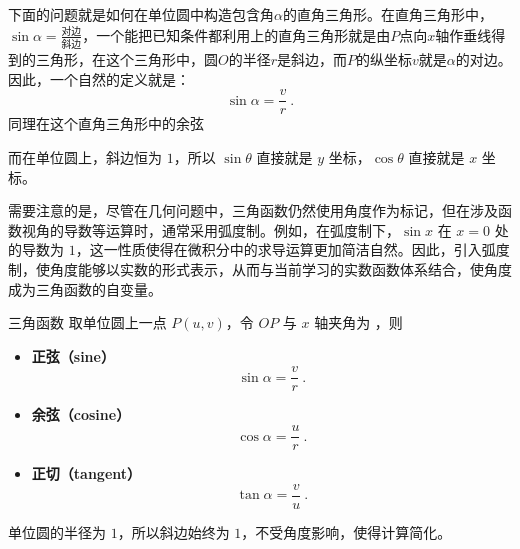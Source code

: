 下面的问题就是如何在单位圆中构造包含角$\alpha$的直角三角形。在直角三角形中，$\displaystyle\sin\alpha = \frac{\text{对边}}{\text{斜边}}$，一个能把已知条件都利用上的直角三角形就是由$P$点向$x$轴作垂线得到的三角形，在这个三角形中，圆$O$的半径$r$是斜边，而$P$的纵坐标$v$就是$\alpha$的对边。因此，一个自然的定义就是：
\begin{equation}
\sin\alpha = \frac{v}{r}~.
\end{equation}
同理在这个直角三角形中的余弦




而在单位圆上，斜边恒为 $1$，所以 $\sin\theta$ 直接就是 $y$ 坐标，$\cos\theta$ 直接就是 $x$ 坐标。


需要注意的是，尽管在几何问题中，三角函数仍然使用角度作为标记，但在涉及函数视角的导数等运算时，通常采用弧度制。例如，在弧度制下，$\sin x$ 在 $x=0$ 处的导数为 $1$，这一性质使得在微积分中的求导运算更加简洁自然。因此，引入弧度制，使角度能够以实数的形式表示，从而与当前学习的实数函数体系结合，使角度成为三角函数的自变量。


\begin{definition}{三角函数}
取单位圆上一点 $P(u,v)$，令 $OP$ 与 $x$ 轴夹角为 ，则
\begin{itemize}
\item \textbf{正弦（sine）}
\begin{equation}
\displaystyle\sin \alpha = \frac{v}{r}~.
\end{equation}
\item \textbf{余弦（cosine）}
\begin{equation}
\displaystyle\cos \alpha = \frac{u}{r}~.
\end{equation}
\item \textbf{正切（tangent）}
\begin{equation}
\displaystyle\tan \alpha = \frac{v}{u}~.
\end{equation}
\end{itemize}
\end{definition}

单位圆的半径为 $1$，所以斜边始终为 $1$，不受角度影响，使得计算简化。



